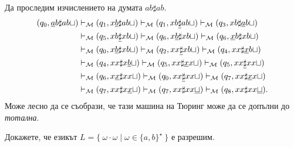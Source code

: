 \begin{extra}
\begin{example}
  Да проследим изчислението на думата $ab\sharp ab$.  
  \begin{align*}
    (q_0, \underline{a}b\sharp ab\sqcup) & \vdash_{\mathcal{M}} (q_1, x\underline{b}\sharp ab\sqcup) \vdash_{\mathcal{M}} (q_1,xb\underline{\sharp}ab\sqcup) \vdash_{\mathcal{M}} (q_3, xb\sharp\underline{a}b\sqcup)\\
                                   & \vdash_{\mathcal{M}} (q_5, xb\underline{\sharp}xb\sqcup) \vdash_{\mathcal{M}} (q_6, x\underline{b}\sharp xb\sqcup) \vdash_{\mathcal{M}} (q_6, \underline{x}b\sharp xb\sqcup)\\
                                   & \vdash_{\mathcal{M}} (q_0, x\underline{b}\sharp xb\sqcup) \vdash_{\mathcal{M}} (q_2, xx\underline{\sharp}xb\sqcup) \vdash_{\mathcal{M}} (q_4, xx\sharp\underline{x}b\sqcup)\\
                                   & \vdash_{\mathcal{M}} (q_4, xx\sharp x\underline{b}\sqcup) \vdash_{\mathcal{M}} (q_5, xx\sharp\underline{x}x\sqcup) \vdash_{\mathcal{M}} (q_5, xx\underline{\sharp} xx\sqcup)\\
                                   & \vdash_{\mathcal{M}} (q_6, x\underline{x}\sharp xx\sqcup) \vdash_{\mathcal{M}} (q_0, xx\underline{\sharp} xx\sqcup) \vdash_{\mathcal{M}} (q_7, xx\sharp\underline{x}x\sqcup)\\
                                   & \vdash_{\mathcal{M}} (q_7, xx\sharp x\underline{x}\sqcup) \vdash_{\mathcal{M}} (q_7, xx\sharp xx\underline{\sqcup}) \vdash_{\mathcal{M}} (q_8,xx\sharp xx\underline{\sqcup}).
  \end{align*}
  Може лесно да се съобрази, че тази машина на Тюринг може да се допълни до {\em тотална}.
\end{example}

\begin{problem}
  Докажете, че езикът $L = \{\ \omega \cdot \omega \mid \omega\in\{a,b\}^\star\ \}$ е разрешим.
\end{problem}

\end{extra}

